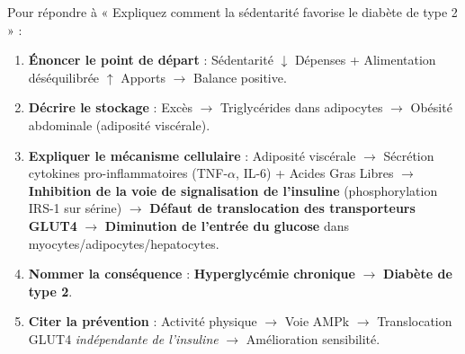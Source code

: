 \documentclass[11pt]{article}
\begin{document}
\begin{methode}
Pour répondre à « Expliquez comment la sédentarité favorise le diabète de type 2 » :
\begin{enumerate}
\item \textbf{Énoncer le point de départ} : Sédentarité $\downarrow$ Dépenses + Alimentation déséquilibrée $\uparrow$ Apports $\rightarrow$ Balance positive.
\item \textbf{Décrire le stockage} : Excès $\rightarrow$ Triglycérides dans adipocytes $\rightarrow$ Obésité abdominale (adiposité viscérale).
\item \textbf{Expliquer le mécanisme cellulaire} : Adiposité viscérale $\rightarrow$ Sécrétion cytokines pro-inflammatoires (TNF-$\alpha$, IL-6) + Acides Gras Libres $\rightarrow$ \textbf{Inhibition de la voie de signalisation de l'insuline} (phosphorylation IRS-1 sur sérine) $\rightarrow$ \textbf{Défaut de translocation des transporteurs GLUT4} $\rightarrow$ \textbf{Diminution de l'entrée du glucose} dans myocytes/adipocytes/hepatocytes.
\item \textbf{Nommer la conséquence} : \textbf{Hyperglycémie chronique} $\rightarrow$ \textbf{Diabète de type 2}.
\item \textbf{Citer la prévention} : Activité physique $\rightarrow$ Voie AMPk $\rightarrow$ Translocation GLUT4 \emph{indépendante de l'insuline} $\rightarrow$ Amélioration sensibilité.
\end{enumerate}
\end{methode}
\end{document}

